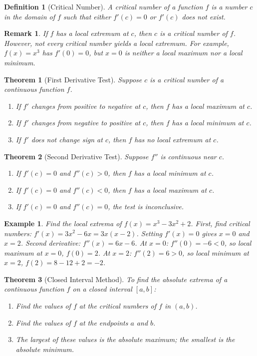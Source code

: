 \documentclass[11pt,a4paper]{article}
\newtheorem{example}{Example}
\newtheorem{theorem}{Theorem}
\newtheorem{definition}{Definition}
\newtheorem{remark}{Remark}
\begin{document}
\begin{definition}[Critical Number]
A \textit{critical number} of a function $f$ is a number $c$ in the domain of $f$ such that either $f'(c) = 0$ or $f'(c)$ does not exist.
\end{definition}
\begin{remark}
If $f$ has a local extremum at $c$, then $c$ is a critical number of $f$. However, not every critical number yields a local extremum. For example, $f(x) = x^3$ has $f'(0) = 0$, but $x = 0$ is neither a local maximum nor a local minimum.
\end{remark}
\begin{theorem}[First Derivative Test]
Suppose $c$ is a critical number of a continuous function $f$.
\begin{enumerate}
\item If $f'$ changes from positive to negative at $c$, then $f$ has a local maximum at $c$.
\item If $f'$ changes from negative to positive at $c$, then $f$ has a local minimum at $c$.
\item If $f'$ does not change sign at $c$, then $f$ has no local extremum at $c$.
\end{enumerate}
\end{theorem}
\begin{theorem}[Second Derivative Test]
Suppose $f''$ is continuous near $c$.
\begin{enumerate}
\item If $f'(c) = 0$ and $f''(c) > 0$, then $f$ has a local minimum at $c$.
\item If $f'(c) = 0$ and $f''(c) < 0$, then $f$ has a local maximum at $c$.
\item If $f'(c) = 0$ and $f''(c) = 0$, the test is inconclusive.
\end{enumerate}
\end{theorem}
\begin{example}
Find the local extrema of $f(x) = x^3 - 3x^2 + 2$.
First, find critical numbers: $f'(x) = 3x^2 - 6x = 3x(x - 2)$. Setting $f'(x) = 0$ gives $x = 0$ and $x = 2$.
Second derivative: $f''(x) = 6x - 6$.
At $x = 0$: $f''(0) = -6 < 0$, so local maximum at $x = 0$, $f(0) = 2$.
At $x = 2$: $f''(2) = 6 > 0$, so local minimum at $x = 2$, $f(2) = 8 - 12 + 2 = -2$.
\end{example}
\begin{theorem}[Closed Interval Method]
To find the absolute extrema of a continuous function $f$ on a closed interval $[a, b]$:
\begin{enumerate}
\item Find the values of $f$ at the critical numbers of $f$ in $(a, b)$.
\item Find the values of $f$ at the endpoints $a$ and $b$.
\item The largest of these values is the absolute maximum; the smallest is the absolute minimum.
\end{enumerate}
\end{theorem}
\end{document}
